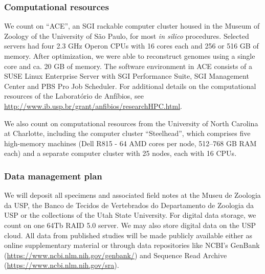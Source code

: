 \subsubsection{Computational resources}

We count on ``ACE'', an SGI rackable computer cluster housed in the Museum of Zoology of the University of São Paulo, for most \textit{in silico} procedures. Selected servers had four 2.3 GHz Operon CPUs with 16 cores each and 256 or 516 GB of memory. After optimization, we were able to reconstruct genomes using a single core and ca. 20 GB of memory. The software environment in ACE consists of a SUSE Linux Enterprise Server with SGI Performance Suite, SGI Management Center and PBS Pro Job Scheduler. For additional details on the computational resources of the Laboratório de Anfíbios, see \href{http://www.ib.usp.br/grant/anfibios/researchHPC.html}{http://www.ib.usp.br/grant/anfibios/researchHPC.html}.

We also count on computational resources from the University of North Carolina at Charlotte, including the computer cluster ``Steelhead'', which comprises five high-memory machines (Dell R815 - 64 AMD cores per node, 512–768 GB RAM each) and a separate computer cluster with 25 nodes, each with 16 CPUs.

\subsubsection{Data management plan}

We will deposit all specimens and associated field notes at the Museu de Zoologia da USP, the Banco de Tecidos de Vertebrados do Departamento de Zoologia da USP or the collections of the Utah State University. For digital data storage, we count on one 64Tb RAID 5.0 server. We may also store digital data on the USP cloud. All data from published studies will be made publicly available either as online supplementary material or through data repositories like NCBI's GenBank (\href{https://www.ncbi.nlm.nih.gov/genbank/}{https://www.ncbi.nlm.nih.gov/genbank/}) and Sequence Read Archive (\href{https://www.ncbi.nlm.nih.gov/sra}{https://www.ncbi.nlm.nih.gov/sra}).